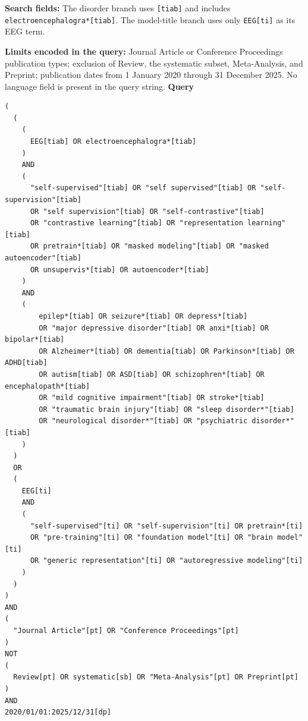\documentclass[11pt,letterpaper]{article}
\begin{document}
\textbf{Search fields:} The disorder branch uses \texttt{[tiab]} and includes \texttt{electroencephalogra*[tiab]}. The model-title branch uses only \texttt{EEG[ti]} as its EEG term.

\textbf{Limits encoded in the query:} Journal Article or Conference Proceedings publication types; exclusion of Review, the systematic subset, Meta-Analysis, and Preprint; publication dates from 1 January 2020 through 31 December 2025. No language field is present in the query string.
\textbf{Query}
\begin{Verbatim}[fontsize=\fontsize{8.5}{10}\selectfont,breaklines=true,breakanywhere=false,breaksymbolleft={},breaksymbolright={},frame=single,framesep=6pt]
(
  (
    (
      EEG[tiab] OR electroencephalogra*[tiab]
    )
    AND
    (
      "self-supervised"[tiab] OR "self supervised"[tiab] OR "self-supervision"[tiab]
      OR "self supervision"[tiab] OR "self-contrastive"[tiab]
      OR "contrastive learning"[tiab] OR "representation learning"[tiab]
      OR pretrain*[tiab] OR "masked modeling"[tiab] OR "masked autoencoder"[tiab]
      OR unsupervis*[tiab] OR autoencoder*[tiab]
    )
    AND
    (
        epilep*[tiab] OR seizure*[tiab] OR depress*[tiab]
        OR "major depressive disorder"[tiab] OR anxi*[tiab] OR bipolar*[tiab]
        OR Alzheimer*[tiab] OR dementia[tiab] OR Parkinson*[tiab] OR ADHD[tiab]
        OR autism[tiab] OR ASD[tiab] OR schizophren*[tiab] OR encephalopath*[tiab]
        OR "mild cognitive impairment"[tiab] OR stroke*[tiab]
        OR "traumatic brain injury"[tiab] OR "sleep disorder*"[tiab]
        OR "neurological disorder*"[tiab] OR "psychiatric disorder*"[tiab]
    )
  )
  OR
  (
    EEG[ti]
    AND
    (
      "self-supervised"[ti] OR "self-supervision"[ti] OR pretrain*[ti]
      OR "pre-training"[ti] OR "foundation model"[ti] OR "brain model"[ti]
      OR "generic representation"[ti] OR "autoregressive modeling"[ti]
    )
  )
)
AND
(
  "Journal Article"[pt] OR "Conference Proceedings"[pt]
)
NOT
(
  Review[pt] OR systematic[sb] OR "Meta-Analysis"[pt] OR Preprint[pt]
)
AND
2020/01/01:2025/12/31[dp]
\end{Verbatim}
\end{document}
